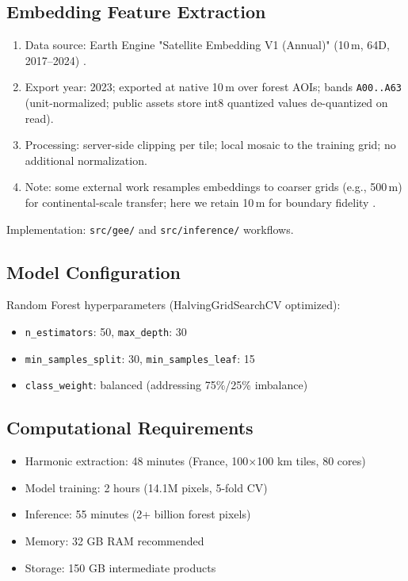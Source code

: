 \documentclass[utf8]{frontiers_suppmat}
\begin{document}
\subsection{Embedding Feature Extraction}
\begin{enumerate}
    \item Data source: Earth Engine "Satellite Embedding V1 (Annual)" (10\,m, 64D, 2017–2024) \citep{Google2025SatelliteEmbeddingV1}.
    \item Export year: 2023; exported at native 10\,m over forest AOIs; bands \texttt{A00..A63} (unit-normalized; public assets store int8 quantized values de-quantized on read).
    \item Processing: server-side clipping per tile; local mosaic to the training grid; no additional normalization.
    \item Note: some external work resamples embeddings to coarser grids (e.g., 500\,m) for continental-scale transfer; here we retain 10\,m for boundary fidelity \citep{Houriez2025AEFDataGen}.
\end{enumerate}
Implementation: \texttt{src/gee/} and \texttt{src/inference/} workflows.

\subsection{Model Configuration}
Random Forest hyperparameters (HalvingGridSearchCV optimized):
\begin{itemize}
    \item \texttt{n\_estimators}: 50, \texttt{max\_depth}: 30
    \item \texttt{min\_samples\_split}: 30, \texttt{min\_samples\_leaf}: 15
    \item \texttt{class\_weight}: balanced (addressing 75\%/25\% imbalance)
\end{itemize}

\subsection{Computational Requirements}
\begin{itemize}
    \item Harmonic extraction: 48 minutes (France, 100×100 km tiles, 80 cores)
    \item Model training: 2 hours (14.1M pixels, 5-fold CV)
    \item Inference: 55 minutes (2+ billion forest pixels)
    \item Memory: 32 GB RAM recommended
    \item Storage: 150 GB intermediate products
\end{itemize}
\end{document}
